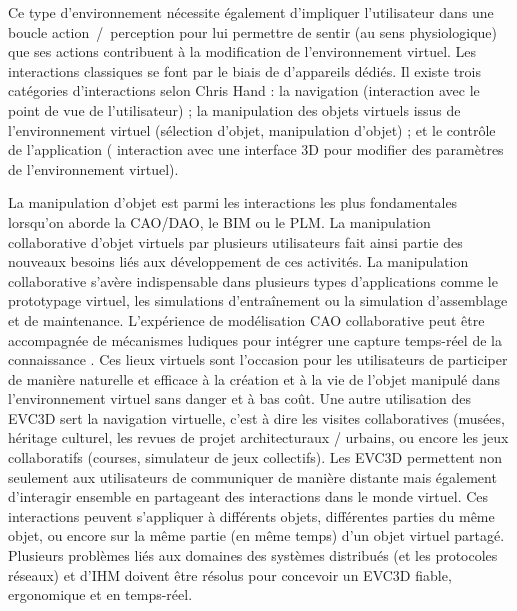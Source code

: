 Ce type d'environnement nécessite également d'impliquer l'utilisateur dans une 
boucle ac\-tion~/~per\-ception pour lui permettre de sentir (au sens physiologique) 
que ses actions contribuent à la modification de l'environnement virtuel. Les 
interactions classiques se font par le biais de d'appareils dédiés.
Il existe trois catégories d'interactions selon Chris Hand \cite{Hand1997}: la 
navigation (interaction avec le point de vue de l'utilisateur) ; la manipulation des 
objets virtuels issus de l'environnement virtuel (sélection d'objet, manipulation 
d'objet) ; et le contrôle de l'application ( interaction avec une interface 3D pour 
modifier des paramètres de l'environnement virtuel).

La manipulation d'objet est parmi les interactions les plus fondamentales lorsqu'on 
aborde la \gls{CAO}/DAO, le \gls{BIM} ou le \gls{PLM}. La manipulation 
collaborative d'objet virtuels par plusieurs utilisateurs fait ainsi partie des nouveaux 
besoins liés aux développement de ces activités.
La manipulation collaborative s'avère indispensable dans plusieurs types 
d'applications comme le prototypage virtuel, les simulations d'entraînement ou la 
simulation d'assemblage et de maintenance. L'expérience de modélisation 
\gls{CAO} collaborative peut être accompagnée de mécanismes ludiques pour 
intégrer une capture temps-réel de la connaissance \cite{Kosmadoudi2013}.
Ces lieux virtuels sont l'occasion pour les utilisateurs de participer de manière 
naturelle et efficace à la création et à la vie de l'objet manipulé dans 
l'environnement virtuel sans danger et à bas coût. 
Une autre utilisation des \gls{EVC3D} sert la navigation virtuelle, c'est à dire les 
visites collaboratives (musées, héritage culturel, les revues de projet 
architecturaux / urbains, ou encore les jeux collaboratifs (courses, simulateur de 
jeux collectifs). 
Les \gls{EVC3D} permettent non seulement aux utilisateurs de communiquer de 
manière distante mais également d'interagir ensemble en partageant des 
interactions dans le monde virtuel. 
Ces interactions peuvent s'appliquer à différents objets, différentes parties du 
même objet, ou encore sur la même partie (en même temps) d'un objet virtuel 
partagé.
Plusieurs problèmes liés aux domaines des systèmes distribués (et les protocoles 
réseaux) et d'IHM doivent être résolus pour concevoir un 
\gls{EVC3D} fiable, ergonomique et en temps-réel. 




